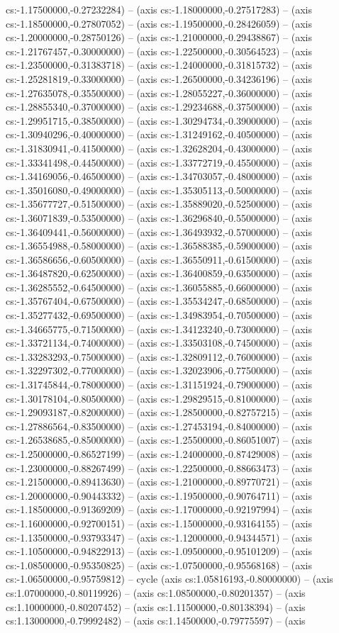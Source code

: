 cs:-1.17500000,-0.27232284) -- (axis cs:-1.18000000,-0.27517283) -- (axis cs:-1.18500000,-0.27807052) -- (axis cs:-1.19500000,-0.28426059) -- (axis cs:-1.20000000,-0.28750126) -- (axis cs:-1.21000000,-0.29438867) -- (axis cs:-1.21767457,-0.30000000) -- (axis cs:-1.22500000,-0.30564523) -- (axis cs:-1.23500000,-0.31383718) -- (axis cs:-1.24000000,-0.31815732) -- (axis cs:-1.25281819,-0.33000000) -- (axis cs:-1.26500000,-0.34236196) -- (axis cs:-1.27635078,-0.35500000) -- (axis cs:-1.28055227,-0.36000000) -- (axis cs:-1.28855340,-0.37000000) -- (axis cs:-1.29234688,-0.37500000) -- (axis cs:-1.29951715,-0.38500000) -- (axis cs:-1.30294734,-0.39000000) -- (axis cs:-1.30940296,-0.40000000) -- (axis cs:-1.31249162,-0.40500000) -- (axis cs:-1.31830941,-0.41500000) -- (axis cs:-1.32628204,-0.43000000) -- (axis cs:-1.33341498,-0.44500000) -- (axis cs:-1.33772719,-0.45500000) -- (axis cs:-1.34169056,-0.46500000) -- (axis cs:-1.34703057,-0.48000000) -- (axis cs:-1.35016080,-0.49000000) -- (axis cs:-1.35305113,-0.50000000) -- (axis cs:-1.35677727,-0.51500000) -- (axis cs:-1.35889020,-0.52500000) -- (axis cs:-1.36071839,-0.53500000) -- (axis cs:-1.36296840,-0.55000000) -- (axis cs:-1.36409441,-0.56000000) -- (axis cs:-1.36493932,-0.57000000) -- (axis cs:-1.36554988,-0.58000000) -- (axis cs:-1.36588385,-0.59000000) -- (axis cs:-1.36586656,-0.60500000) -- (axis cs:-1.36550911,-0.61500000) -- (axis cs:-1.36487820,-0.62500000) -- (axis cs:-1.36400859,-0.63500000) -- (axis cs:-1.36285552,-0.64500000) -- (axis cs:-1.36055885,-0.66000000) -- (axis cs:-1.35767404,-0.67500000) -- (axis cs:-1.35534247,-0.68500000) -- (axis cs:-1.35277432,-0.69500000) -- (axis cs:-1.34983954,-0.70500000) -- (axis cs:-1.34665775,-0.71500000) -- (axis cs:-1.34123240,-0.73000000) -- (axis cs:-1.33721134,-0.74000000) -- (axis cs:-1.33503108,-0.74500000) -- (axis cs:-1.33283293,-0.75000000) -- (axis cs:-1.32809112,-0.76000000) -- (axis cs:-1.32297302,-0.77000000) -- (axis cs:-1.32023906,-0.77500000) -- (axis cs:-1.31745844,-0.78000000) -- (axis cs:-1.31151924,-0.79000000) -- (axis cs:-1.30178104,-0.80500000) -- (axis cs:-1.29829515,-0.81000000) -- (axis cs:-1.29093187,-0.82000000) -- (axis cs:-1.28500000,-0.82757215) -- (axis cs:-1.27886564,-0.83500000) -- (axis cs:-1.27453194,-0.84000000) -- (axis cs:-1.26538685,-0.85000000) -- (axis cs:-1.25500000,-0.86051007) -- (axis cs:-1.25000000,-0.86527199) -- (axis cs:-1.24000000,-0.87429008) -- (axis cs:-1.23000000,-0.88267499) -- (axis cs:-1.22500000,-0.88663473) -- (axis cs:-1.21500000,-0.89413630) -- (axis cs:-1.21000000,-0.89770721) -- (axis cs:-1.20000000,-0.90443332) -- (axis cs:-1.19500000,-0.90764711) -- (axis cs:-1.18500000,-0.91369209) -- (axis cs:-1.17000000,-0.92197994) -- (axis cs:-1.16000000,-0.92700151) -- (axis cs:-1.15000000,-0.93164155) -- (axis cs:-1.13500000,-0.93793347) -- (axis cs:-1.12000000,-0.94344571) -- (axis cs:-1.10500000,-0.94822913) -- (axis cs:-1.09500000,-0.95101209) -- (axis cs:-1.08500000,-0.95350825) -- (axis cs:-1.07500000,-0.95568168) -- (axis cs:-1.06500000,-0.95759812) -- cycle (axis cs:1.05816193,-0.80000000) -- (axis cs:1.07000000,-0.80119926) -- (axis cs:1.08500000,-0.80201357) -- (axis cs:1.10000000,-0.80207452) -- (axis cs:1.11500000,-0.80138394) -- (axis cs:1.13000000,-0.79992482) -- (axis cs:1.14500000,-0.79775597) -- (axis 